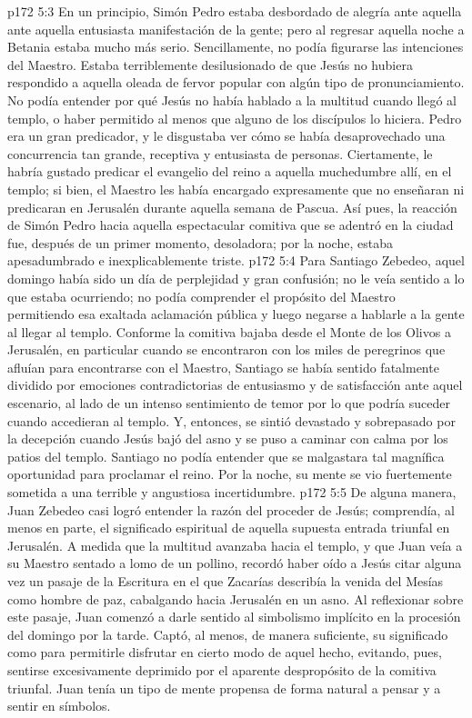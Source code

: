 \vs p172 5:3 En un principio, Simón Pedro estaba desbordado de alegría ante aquella ante aquella entusiasta manifestación de la gente; pero al regresar aquella noche a Betania estaba mucho más serio. Sencillamente, no podía figurarse las intenciones del Maestro. Estaba terriblemente desilusionado de que Jesús no hubiera respondido a aquella oleada de fervor popular con algún tipo de pronunciamiento. No podía entender por qué Jesús no había hablado a la multitud cuando llegó al templo, o haber permitido al menos que alguno de los discípulos lo hiciera. Pedro era un gran predicador, y le disgustaba ver cómo se había desaprovechado una concurrencia tan grande, receptiva y entusiasta de personas. Ciertamente, le habría gustado predicar el evangelio del reino a aquella muchedumbre allí, en el templo; si bien, el Maestro les había encargado expresamente que no enseñaran ni predicaran en Jerusalén durante aquella semana de Pascua. Así pues, la reacción de Simón Pedro hacia aquella espectacular comitiva que se adentró en la ciudad fue, después de un primer momento, desoladora; por la noche, estaba apesadumbrado e inexplicablemente triste.
\vs p172 5:4 Para Santiago Zebedeo, aquel domingo había sido un día de perplejidad y gran confusión; no le veía sentido a lo que estaba ocurriendo; no podía comprender el propósito del Maestro permitiendo esa exaltada aclamación pública y luego negarse a hablarle a la gente al llegar al templo. Conforme la comitiva bajaba desde el Monte de los Olivos a Jerusalén, en particular cuando se encontraron con los miles de peregrinos que afluían para encontrarse con el Maestro, Santiago se había sentido fatalmente dividido por emociones contradictorias de entusiasmo y de satisfacción ante aquel escenario, al lado de un intenso sentimiento de temor por lo que podría suceder cuando accedieran al templo. Y, entonces, se sintió devastado y sobrepasado por la decepción cuando Jesús bajó del asno y se puso a caminar con calma por los patios del templo. Santiago no podía entender que se malgastara tal magnífica oportunidad para proclamar el reino. Por la noche, su mente se vio fuertemente sometida a una terrible y angustiosa incertidumbre.
\vs p172 5:5 De alguna manera, Juan Zebedeo casi logró entender la razón del proceder de Jesús; comprendía, al menos en parte, el significado espiritual de aquella supuesta entrada triunfal en Jerusalén. A medida que la multitud avanzaba hacia el templo, y que Juan veía a su Maestro sentado a lomo de un pollino, recordó haber oído a Jesús citar alguna vez un pasaje de la Escritura en el que Zacarías describía la venida del Mesías como hombre de paz, cabalgando hacia Jerusalén en un asno. Al reflexionar sobre este pasaje, Juan comenzó a darle sentido al simbolismo implícito en la procesión del domingo por la tarde. Captó, al menos, de manera suficiente, su significado como para permitirle disfrutar en cierto modo de aquel hecho, evitando, pues, sentirse excesivamente deprimido por el aparente despropósito de la comitiva triunfal. Juan tenía un tipo de mente propensa de forma natural a pensar y a sentir en símbolos.
